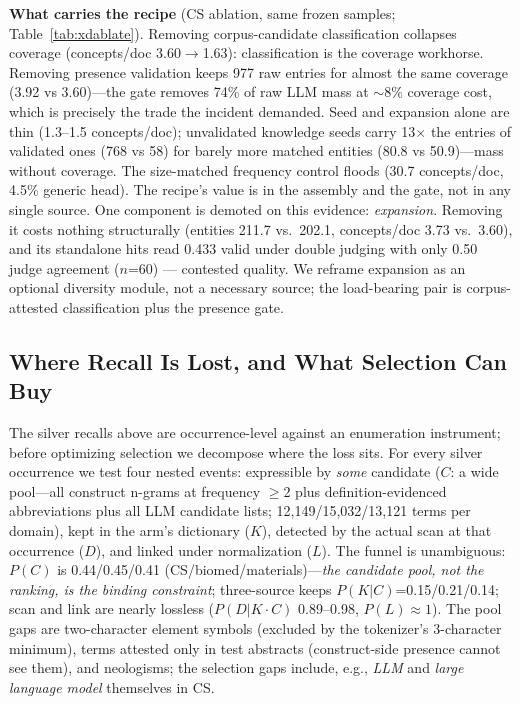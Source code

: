 \documentclass[preprint,12pt]{elsarticle}
\begin{document}
\textbf{What carries the recipe} (CS ablation, same frozen samples;
Table~\ref{tab:xdablate}). Removing corpus-candidate classification
collapses coverage (concepts/doc 3.60$\to$1.63): classification is the
coverage workhorse. Removing presence validation keeps 977 raw entries
for almost the same coverage (3.92 vs 3.60)---the gate removes 74\% of
raw LLM mass at ${\sim}$8\% coverage cost, which is precisely the trade
the incident demanded. Seed and expansion alone are thin (1.3--1.5
concepts/doc); unvalidated knowledge seeds carry 13$\times$ the entries
of validated ones (768 vs 58) for barely more matched entities (80.8
vs 50.9)---mass without coverage. The size-matched frequency control
floods (30.7 concepts/doc, 4.5\% generic head). The recipe's value is
in the assembly and the gate, not in any single source. One component is demoted on this evidence: \emph{expansion}.
Removing it costs nothing structurally (entities 211.7 vs.\ 202.1,
concepts/doc 3.73 vs.\ 3.60), and its standalone hits read 0.433
valid under double judging with only 0.50 judge agreement ($n$=60) ---
contested quality. We reframe expansion as an optional
diversity module, not a necessary source; the load-bearing pair is
corpus-attested classification plus the presence gate.

\subsection{Where Recall Is Lost, and What Selection Can Buy}
\label{sec:funnel}

The silver recalls above are occurrence-level against an enumeration
instrument; before optimizing selection we decompose where the loss
sits. For every silver occurrence we test four nested events:
expressible by \emph{some} candidate ($C$: a wide pool---all
construct n-grams at frequency $\geq$2 plus definition-evidenced
abbreviations plus all LLM candidate lists; 12{,}149/15{,}032/13{,}121
terms per domain), kept in the arm's dictionary ($K$), detected by the
actual scan at that occurrence ($D$), and linked under normalization
($L$). The funnel is unambiguous: $P(C)$ is 0.44/0.45/0.41
(CS/biomed/materials)---\emph{the candidate pool, not the ranking, is
the binding constraint}; three-source keeps $P(K|C)$=0.15/0.21/0.14;
scan and link are nearly lossless ($P(D|K\cdot C)$ 0.89--0.98,
$P(L)\approx 1$). The pool gaps are two-character element symbols
(excluded by the tokenizer's 3-character minimum), terms attested only
in test abstracts (construct-side presence cannot see them), and
neologisms; the selection gaps include, e.g., \emph{LLM} and
\emph{large language model} themselves in CS.
\end{document}
